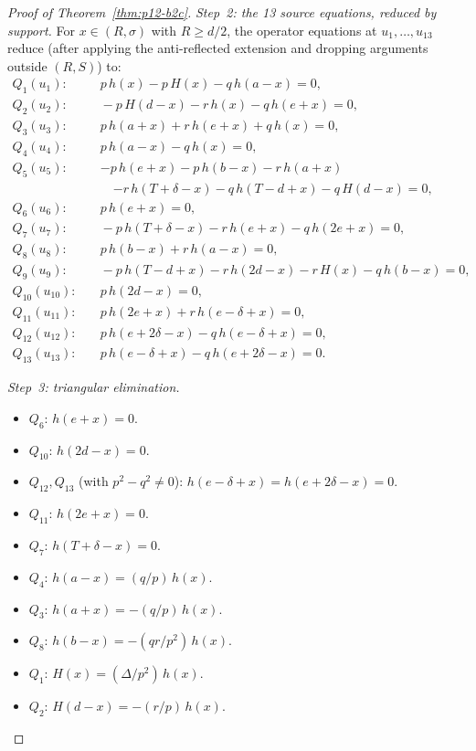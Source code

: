 \begin{proof}[Proof of Theorem~\ref{thm:p12-b2c}]
\smallskip
\noindent\emph{Step~2: the 13 source equations, reduced by support.}
For $x \in (R, \sigma)$ with $R \ge d/2$, the operator equations at
$u_{1}, \dots, u_{13}$ reduce (after applying the anti-reflected
extension and dropping arguments outside $(R, S)$) to:
\begin{align*}
Q_{1}(u_{1}): & \quad p\, h(x) - p\, H(x) - q\, h(a - x) = 0,\\
Q_{2}(u_{2}): & \quad -p\, H(d - x) - r\, h(x) - q\, h(e + x) = 0,\\
Q_{3}(u_{3}): & \quad p\, h(a + x) + r\, h(e + x) + q\, h(x) = 0,\\
Q_{4}(u_{4}): & \quad p\, h(a - x) - q\, h(x) = 0,\\
Q_{5}(u_{5}): & \quad {-p\, h(e + x) - p\, h(b - x) - r\, h(a + x)}\\
              & \qquad {- r\, h(T + \delta - x) - q\, h(T - d + x)
                          - q\, H(d - x) = 0,}\\
Q_{6}(u_{6}): & \quad p\, h(e + x) = 0,\\
Q_{7}(u_{7}): & \quad -p\, h(T + \delta - x) - r\, h(e + x)
                       - q\, h(2e + x) = 0,\\
Q_{8}(u_{8}): & \quad p\, h(b - x) + r\, h(a - x) = 0,\\
Q_{9}(u_{9}): & \quad -p\, h(T - d + x) - r\, h(2d - x) - r\, H(x)
                       - q\, h(b - x) = 0,\\
Q_{10}(u_{10}): & \quad p\, h(2d - x) = 0,\\
Q_{11}(u_{11}): & \quad p\, h(2e + x) + r\, h(e - \delta + x) = 0,\\
Q_{12}(u_{12}): & \quad p\, h(e + 2\delta - x) - q\, h(e - \delta + x) = 0,\\
Q_{13}(u_{13}): & \quad p\, h(e - \delta + x) - q\, h(e + 2\delta - x) = 0.
\end{align*}

\smallskip
\noindent\emph{Step~3: triangular elimination.}
\begin{itemize}
\item $Q_{6}$: $h(e + x) = 0$.
\item $Q_{10}$: $h(2d - x) = 0$.
\item $Q_{12}, Q_{13}$ (with $p^{2} - q^{2} \ne 0$):
  $h(e - \delta + x) = h(e + 2\delta - x) = 0$.
\item $Q_{11}$: $h(2e + x) = 0$.
\item $Q_{7}$: $h(T + \delta - x) = 0$.
\item $Q_{4}$: $h(a - x) = (q/p)\, h(x)$.
\item $Q_{3}$: $h(a + x) = -(q/p)\, h(x)$.
\item $Q_{8}$: $h(b - x) = -(qr/p^{2})\, h(x)$.
\item $Q_{1}$: $H(x) = (\Delta / p^{2})\, h(x)$.
\item $Q_{2}$: $H(d - x) = -(r/p)\, h(x)$.
\end{itemize}


\end{proof}
